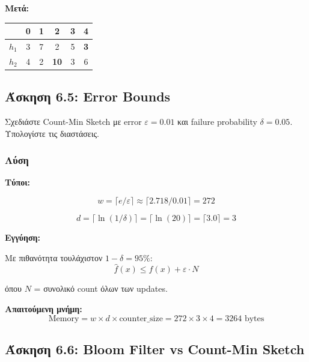 \textbf{Μετά:}
\begin{center}
\begin{tabular}{c|ccccc}
 & 0 & 1 & 2 & 3 & 4 \\
\hline
$h_1$ & 3 & 7 & 2 & 5 & \textbf{3} \\
$h_2$ & 4 & 2 & \textbf{10} & 3 & 6 \\
\end{tabular}
\end{center}

\subsection{Άσκηση 6.5: Error Bounds}

\begin{formulabox}[Εκφώνηση]
Σχεδιάστε Count-Min Sketch με error $\varepsilon = 0.01$ και failure probability
$\delta = 0.05$. Υπολογίστε τις διαστάσεις.
\end{formulabox}

\subsubsection*{Λύση}

\textbf{Τύποι:}

$$w = \lceil e / \varepsilon \rceil \approx \lceil 2.718 / 0.01 \rceil = 272$$

$$d = \lceil \ln(1/\delta) \rceil = \lceil \ln(20) \rceil = \lceil 3.0 \rceil = 3$$

\textbf{Εγγύηση:}

Με πιθανότητα τουλάχιστον $1 - \delta = 95\%$:
$$\hat{f}(x) \leq f(x) + \varepsilon \cdot N$$

όπου $N$ = συνολικό count όλων των updates.

\textbf{Απαιτούμενη μνήμη:}
$$\text{Memory} = w \times d \times \text{counter\_size} = 272 \times 3 \times 4 = 3264 \text{ bytes}$$

\subsection{Άσκηση 6.6: Bloom Filter vs Count-Min Sketch}

